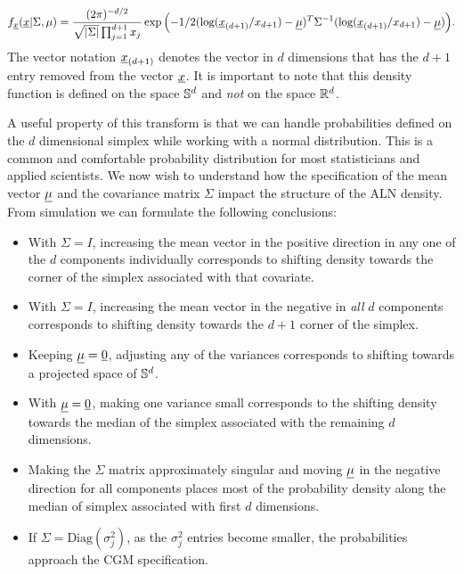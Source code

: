 \begin{equation}
f_{\underline{x}}(\underline{x}\vert \Sigma, \mu)=\frac{(2\pi)^{-d/2}}{\sqrt{\vert\Sigma\vert}\prod_{j=1}^{d+1}x_j } 
\exp{\left(-1/2(\text{log}(\underline{x}_{(d+1)}/x_{d+1})-\underline{\mu})^T\Sigma^{-1}(\text{log}(\underline{x}_{(d+1)}/x_{d+1})-\underline{\mu})\right)}.
\end{equation}
The vector notation $\underline{x}_{(d+1)}$ denotes the vector in $d$ dimensions that has the $d+1$ entry removed from the vector $\underline{x}$. 
It is important to note that this density function is defined on the space $\mathbb{S}^{d}$ and \emph{not} on the space $\mathbb{R}^{d}$. 

A useful property of this transform is that we can handle probabilities defined on the $d$ dimensional simplex while working with a normal distribution. This is a common and comfortable probability distribution for most statisticians and applied scientists.
We now wish to understand how the specification of the mean vector $\underline{\mu}$ and the covariance matrix $\Sigma$ impact the structure of the ALN density. From simulation we can formulate the following conclusions: 

\begin{itemize}
\item With $\Sigma=I$, increasing the mean vector in the positive direction in any one of the $d$ components individually corresponds to shifting density towards the corner of the simplex associated with that covariate. 
\item With $\Sigma=I$, increasing the mean vector in the negative in \emph{all} $d$ components corresponds to shifting density towards the $d+1$ corner of the simplex. 
\item Keeping $\underline{\mu} =\underline{{0}}$, adjusting any of the variances corresponds to shifting towards a projected space of $\mathbb{S}^{d}$. 
\item With $\underline{\mu} =\underline{{0}}$, making one variance small corresponds to the shifting density towards the median of the simplex associated with the remaining $d$ dimensions. 
\item Making the $\Sigma$ matrix approximately singular and moving $\underline{\mu}$ in the negative direction for all components places most of the probability density along the median of simplex associated with first $d$ dimensions. 
\item If $\Sigma = \text{Diag}(\sigma^2_j)$, as the $\sigma^2_j$ entries become smaller, the probabilities approach the CGM specification.    
\end{itemize}

